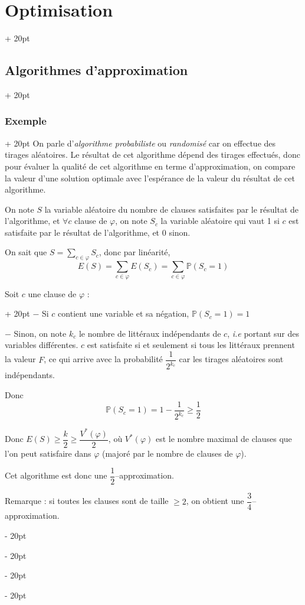 \documentclass[a4paper, 12pt, twoside]{article}
\renewcommand{\ge}{\geqslant}
\newcommand{\ind}[1][20pt]{\advance\leftskip + #1}
\newcommand{\deind}[1][20pt]{\advance\leftskip - #1}
\newenvironment{indt}[2][20pt]{#2 \par \ind[#1]}{\par \deind} %
\newcommand{\1}{\mathbbm 1}
\begin{document}
\begin{indt}{\section{Optimisation}}
\begin{indt}{\subsection{Algorithmes d'approximation}}
\begin{indt}{\subsubsection{Exemple}}
                On parle d'\emph{algorithme probabiliste} ou \emph{randomisé} car on effectue des tirages aléatoires.
                Le résultat de cet algorithme dépend des tirages effectués, donc pour évaluer la qualité de cet algorithme en terme d'approximation, on compare la valeur d'une solution optimale avec l'espérance de la valeur du résultat de cet algorithme.

                On note $S$ la variable aléatoire du nombre de clauses satisfaites par le résultat de l'algorithme, et $\forall c$ clause de $\varphi$, on note $S_c$ la variable aléatoire qui vaut 1 si $c$ est satisfaite par le résultat de l'algorithme, et 0 sinon.

                On sait que $\displaystyle S = \sum_{c \in \varphi} S_c$, donc par linéarité,
                \[
                    E(S) = \sum_{c \in \varphi} E(S_c)
                    = \sum_{c \in \varphi} \mathbb P(S_c = 1)
                \]

                \begin{indt}{Soit $c$ une clause de $\varphi$ :}
                    $-$ Si $c$ contient une variable et sa négation, $\mathbb P(S_c = 1) = 1$

                    $-$ Sinon, on note $k_c$ le nombre de littéraux indépendants de $c$, \textit{i.e} portant sur des variables différentes.
                    $c$ est satisfaite si et seulement si tous les littéraux prennent la valeur $F$, ce qui arrive avec la probabilité $\dfrac{1}{2^{k_c}}$ car les tirages aléatoires sont indépendants.

                    Donc
                    \[
                        \mathbb P(S_c = 1) = 1 - \dfrac{1}{2^{k_c}} \ge \dfrac 1 2
                    \]

                    Donc $E(S) \ge \dfrac k 2 \ge \dfrac{V^*(\varphi)}{2}$, où $V^*(\varphi)$ est le nombre maximal de clauses que l'on peut satisfaire dans $\varphi$ (majoré par le nombre de clauses de $\varphi$).

                    Cet algorithme est donc une $\dfrac 1 2$--approximation.

                    \vspace{12pt}
                    
                    Remarque : si toutes les clauses sont de taille $\ge 2$, on obtient une $\dfrac 3 4$--approximation.
                \end{indt}
            \end{indt}
        \end{indt}
    \end{indt}
\end{document}
